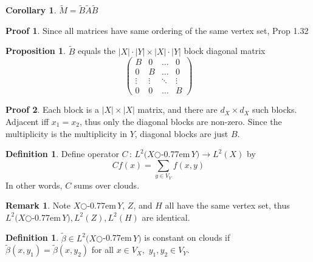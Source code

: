 \documentclass{book}
\newcommand{\zigzag}{$\bigcirc$\kern-0.77em\raisebox{-.16ex}{\small Z}$\,$}
\newcommand{\abs}[1]{\lvert #1 \rvert }
\theoremstyle{definition}
\newtheorem{proposition}[lemma]{Proposition}
\newtheorem{corollary}[lemma]{Corollary}
\newtheorem{definition}[lemma]{Definition}
\theoremstyle{remarkstyle}
\newtheorem*{remark}{Remark}%
\newtheorem*{myproof}{Proof}%
\begin{document}
\begin{corollary}
    $\tilde{M}=\tilde{B}\tilde{A}\tilde{B}$
\end{corollary}
\begin{myproof}
    Since all matrices have same ordering of the same vertex set, Prop 1.32 \newline 
\end{myproof}

\begin{proposition}
    $\tilde{B}$ equals the $\abs{X}\cdot\abs{Y}\times\abs{X}\cdot\abs{Y}$ block diagonal matrix
    $$
    \left(\begin{array}{cccc}
        B & 0 & \dots & 0 \\
        0 & B & \dots & 0 \\
        \vdots & \vdots & \ddots  & \vdots \\
        0 & 0 & \dots & B
    \end{array}\right)
    $$
\end{proposition}
\begin{myproof}
    Each block is a $\abs{X}\times\abs{X}$ matrix, and there are $d_X \times d_X$ such blocks. Adjacent iff $x_1=x_2$, thus only the diagonal blocks are non-zero. Since the multiplicity is the multiplicity in $Y$, diagonal blocks are just $B$. \newline
\end{myproof}

\begin{definition}
    Define operator $C\,:\, L^{2}(X$\zigzag$Y)\rightarrow L^{2}(X) $ by 
    $$
    Cf(x) = \sum_{y\in V_Y}f(x,y)
    $$
    In other words, $C$ sums over clouds.
\end{definition}
\begin{remark}
    Note $X$\zigzag$Y$, $Z$, and $H$ all have the same vertex set, thus $L^{2}(X$\zigzag$Y), L^{2}(Z), L^{2}(H)$ are identical. \newline
\end{remark}

\begin{definition}
    $\tilde{\beta}\in L^{2}(X$\zigzag$Y)$ is constant on clouds if $\tilde{\beta}(x,y_1)=\tilde{\beta}(x,y_2)$ for all $x\in V_X,$ $y_1,y_2\in V_Y$. \newline
\end{definition}
\end{document}
